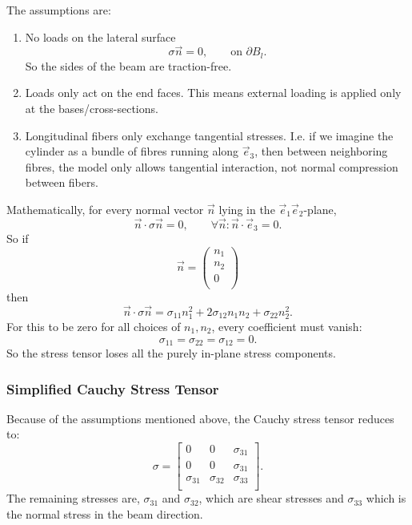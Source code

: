 The assumptions are:
\begin{enumerate}
  \item No loads on the lateral surface
    \begin{equation*}
      \sigma \Vec{n} = 0, \qquad \text{on } \partial B_l
    .\end{equation*}
    So the sides of the beam are traction-free.
  \item Loads only act on the end faces.
    This means external loading is applied only at the bases/cross-sections.
  \item Longitudinal fibers only exchange tangential stresses.
    I.e. if we imagine the cylinder as a bundle of fibres running along $\Vec{e}_3$, then between neighboring fibres, the model only allows tangential interaction, not normal compression between fibers.
\end{enumerate}
Mathematically, for every normal vector $\Vec{n}$ lying in the $\Vec{e}_1 \Vec{e}_2$-plane,
\begin{equation*}
  \Vec{n} \cdot \sigma \Vec{n} = 0, \qquad \forall \Vec{n} : \Vec{n} \cdot \Vec{e}_3 = 0
.\end{equation*}
So if
\begin{equation*}
  \Vec{n} = \begin{pmatrix}
    n_1\\
  n_2\\
  0\\
  \end{pmatrix}
\end{equation*}
then
\begin{equation*}
  \Vec{n} \cdot \sigma \Vec{n} = \sigma_{11} n_1^2 + 2\sigma_{12}n_1n_2 + \sigma_{22}n_2^2
.\end{equation*}
For this to be zero for all choices of $n_1, n_2$, every coefficient must vanish:
\begin{equation*}
  \sigma_{11} = \sigma_{22} = \sigma_{12} = 0
.\end{equation*}
So the stress tensor loses all the purely in-plane stress components. 

\subsubsection{Simplified Cauchy Stress Tensor}
Because of the assumptions mentioned above, the Cauchy stress tensor reduces to:
\begin{equation*}
  \sigma = \begin{bmatrix}
    0 & 0 & \sigma_{31}\\
  0 & 0 & \sigma_{31}\\
  \sigma_{31} & \sigma_{32} & \sigma_{33}\\
  \end{bmatrix}
.\end{equation*}
The remaining stresses are, $\sigma_{31}$ and $\sigma_{32}$, which are shear stresses and $\sigma_{33}$ which is the normal stress in the beam direction. 

